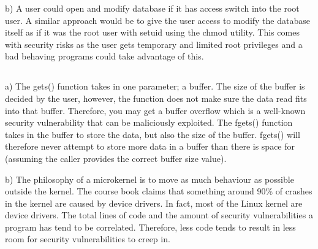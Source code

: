 \documentclass{article}
\begin{document}
b) A user could open and modify database if it has access switch into the root user. A similar approach would be to give the user access to modify the database itself as if it was the root user with setuid  using the chmod utility. This comes with security risks as the user gets temporary and limited root privileges and a bad behaving programs could take advantage of this.

\subsection{}
a) The gets() function takes in one parameter; a buffer. The size of the buffer is decided by the user, however, the function does not make sure the data read fits into that buffer. Therefore, you may get a buffer overflow which is a well-known security vulnerability that can be maliciously exploited. The fgets() function takes in the buffer to store the data, but also the size of the buffer. fgets() will therefore never attempt to store more data in a buffer than there is space for (assuming the caller provides the correct buffer size value).

b) The philosophy of a microkernel is to move as much behaviour as possible outside the kernel. The course book claims that something around 90\% of crashes in the kernel are caused by device drivers. In fact, most of the Linux kernel are device drivers. The total lines of code and the amount of security vulnerabilities a program has tend to be correlated. Therefore, less code tends to result in less room for security vulnerabilities to creep in.
\end{document}
